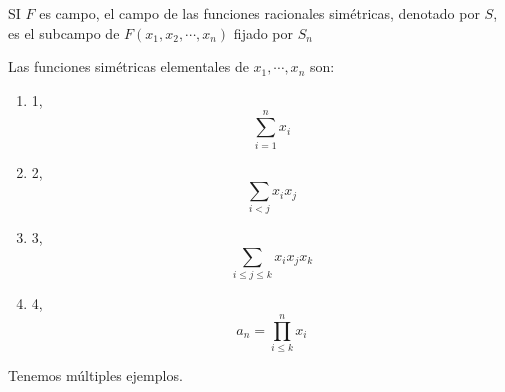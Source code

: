 \begin{definicion}
    SI $F$ es campo, el campo de las funciones  racionales simétricas, denotado por $S$, es el subcampo de $F(x_1,x_2,\cdots,x_n)$ fijado por $S_n$
\end{definicion}

\begin{definicion}
    Las funciones simétricas elementales de $x_1,\cdots,x_n$ son: 
    \begin{enumerate}
        \item 1, 
        $$\sum_{i=1}^n x_i$$
        \item 2, 
        $$\sum_{i<j}x_ix_j$$
        \item 3, 
        $$\sum_{i\leq j\leq k}x_ix_jx_k$$
        \item 4, 
        $$a_n=\prod_{i\leq k}^nx_i$$
    \end{enumerate}
\end{definicion}

\begin{ejemplo}
    Tenemos múltiples ejemplos. 
\end{ejemplo}